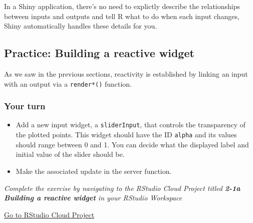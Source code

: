 \documentclass[
  letterpaper,
  DIV=11,
  numbers=noendperiod]{scrreprt}
\begin{document}
In a Shiny application, there's no need to explictly describe the
relationships between inputs and outputs and tell R what to do when each
input changes, Shiny automatically handles these details for you.

\hypertarget{practice-building-a-reactive-widget}{%
\subsection{Practice: Building a reactive
widget}\label{practice-building-a-reactive-widget}}

As we saw in the previous sections, reactivity is established by linking
an input with an output via a \texttt{render*()} function.

\hypertarget{your-turn-8}{%
\subsubsection{Your turn}\label{your-turn-8}}

\begin{itemize}
\item
  Add a new input widget, a \texttt{sliderInput}, that controls the
  transparency of the plotted points. This widget should have the ID
  \texttt{alpha} and its values should range between 0 and 1. You can
  decide what the displayed label and initial value of the slider should
  be.
\item
  Make the associated update in the server function.
\end{itemize}

\emph{Complete the exercise by navigating to the RStudio Cloud Project
titled \textbf{2-1a Building a reactive widget} in your RStudio
Workspace}

\href{https://rstudio.cloud/spaces/81721/join?access_code=I4VJaNsKfTqR3Td9hLP7E1nz8\%2FtMg6Xbw9Bgqumv}{
Go to RStudio Cloud Project}
\end{document}

